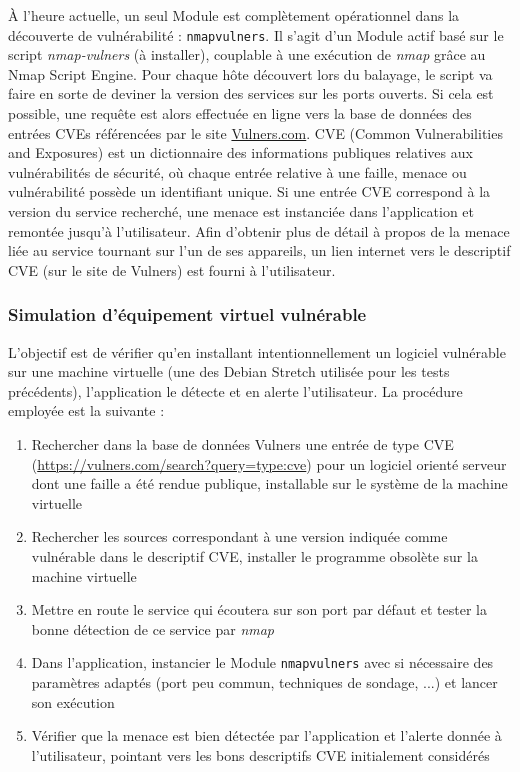 \documentclass[]{article}
\begin{document}
À l'heure actuelle, un seul Module est complètement opérationnel dans la découverte de vulnérabilité : \texttt{nmapvulners}. Il s'agit d'un Module actif basé sur le script \textit{nmap-vulners} (à installer), couplable à une exécution de \textit{nmap} grâce au Nmap Script Engine. Pour chaque hôte découvert lors du balayage, le script va faire en sorte de deviner la version des services sur les ports ouverts. Si cela est possible, une requête est alors effectuée en ligne vers la base de données des entrées CVEs référencées par le site \href{https://vulners.com/}{Vulners.com}. CVE (Common Vulnerabilities and Exposures) est un dictionnaire des informations publiques relatives aux vulnérabilités de sécurité, où chaque entrée relative à une faille, menace ou vulnérabilité possède un identifiant unique. Si une entrée CVE correspond à la version du service recherché, une menace est instanciée dans l'application et remontée jusqu'à l'utilisateur. Afin d'obtenir plus de détail à propos de la menace liée au service tournant sur l'un de ses appareils, un lien internet vers le descriptif CVE (sur le site de Vulners) est fourni à l'utilisateur.

\subsubsection{Simulation d'équipement virtuel vulnérable}

L'objectif est de vérifier qu'en installant intentionnellement un logiciel vulnérable sur une machine virtuelle (une des Debian Stretch utilisée pour les tests précédents), l'application le détecte et en alerte l'utilisateur. La procédure employée est la suivante :

\begin{enumerate}
\item Rechercher dans la base de données Vulners une entrée de type CVE (\url{https://vulners.com/search?query=type:cve}) pour un logiciel orienté serveur dont une faille a été rendue publique, installable sur le système de la machine virtuelle
\vspace{0.1cm}
\item Rechercher les sources correspondant à une version indiquée comme vulnérable dans le descriptif CVE, installer le programme obsolète sur la machine virtuelle
\vspace{0.1cm}
\item Mettre en route le service qui écoutera sur son port par défaut et tester la bonne détection de ce service par \textit{nmap}
\vspace{0.1cm}
\item Dans l'application, instancier le Module \texttt{nmapvulners} avec si nécessaire des paramètres adaptés (port peu commun, techniques de sondage, ...) et lancer son exécution
\vspace{0.1cm}
\item Vérifier que la menace est bien détectée par l'application et l'alerte donnée à l'utilisateur, pointant vers les bons descriptifs CVE initialement considérés
\end{enumerate}
\end{document}
